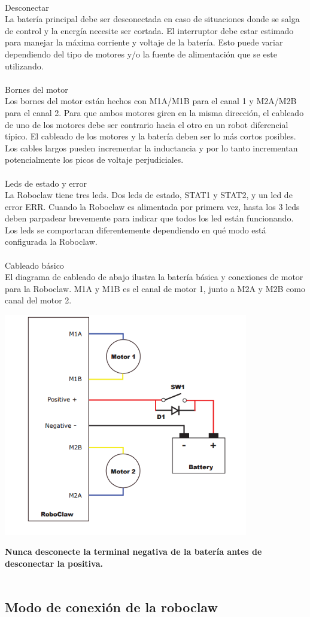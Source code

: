 \documentclass[user_manual.tex]{subfiles}
\begin{document}
\\
Desconectar\\
La batería principal debe ser desconectada en caso de situaciones donde se salga de control y la energía necesite ser
cortada. El interruptor debe estar estimado para manejar la máxima corriente y voltaje de la batería. Esto puede variar
dependiendo del tipo de motores y/o la fuente de alimentación que se este utilizando.\\
\\
Bornes del motor\\
Los bornes del motor están hechos con M1A/M1B para el canal 1 y M2A/M2B para el canal 2. Para que ambos motores giren en
la misma dirección, el cableado de uno de los motores debe ser contrario hacia el otro en un robot diferencial típico. El
cableado de los motores y la batería deben ser lo más cortos posibles. Los cables largos pueden incrementar la inductancia
y por lo tanto incrementan potencialmente los picos de voltaje perjudiciales.\\
\\
Leds de estado y error\\
La Roboclaw tiene tres leds. Dos leds de estado, STAT1 y STAT2, y un led de error ERR. Cuando la Roboclaw es alimentada por
primera vez, hasta los 3 leds deben parpadear brevemente para indicar que todos los led están funcionando. Los leds se
comportaran diferentemente dependiendo en qué modo está configurada la Roboclaw.\\
\\
Cableado básico\\
El diagrama de cableado de abajo ilustra la batería básica y conexiones de motor para la Roboclaw. M1A y M1B es el canal
de motor 1, junto a M2A y M2B como canal del motor 2.\\

\begin{center}
\includegraphics[width=0.8\textwidth]{Figures/Hardware/Partes/Motores.png}
\label{fig:Hardware:Partes:Motores}
\end{center}

\textbf{Nunca desconecte la terminal negativa de la batería antes de desconectar la positiva.}\\
\\

\subsection{Modo de conexión de la roboclaw}




 
\end{document}
